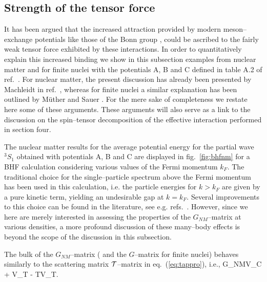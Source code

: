 \subsection{Strength of the tensor force}
It has been argued that the increased attraction provided
by modern meson--exchange potentials like those of the Bonn group
\cite{mac89,mhe87}, could be ascribed to the fairly weak tensor force
exhibited by these interactions. In order to quantitatively
explain this increased binding we show in this subsection examples
from nuclear matter and for finite nuclei with the potentials A, B and C defined
in table A.2 of ref.\ \cite{mac89}. For nuclear matter, the present
discussion has already been presented by Machleidt in ref.\  \cite{mac89},
whereas for finite nuclei a similar explanation has been
outlined by M\"{u}ther and Sauer \cite{ms92}. For the mere sake of
completeness we restate here some of these arguments. These arguments
will also serve as a link to the discussion on
the spin--tensor decomposition of
the effective interaction performed in section four.


The nuclear matter results for the average potential energy for the partial wave $^{3}S_1$
obtained with potentials A, B and C are displayed
in fig.\ \ref{fig:bhfnm} for a BHF calculation considering various values of
the Fermi
momentum $k_F$. The traditional choice for the single--particle
spectrum above the Fermi momentum has been used in this calculation,
i.e. the particle energies for $k > k_F$ are given by a pure kinetic
term,
yielding an undesirable gap at $k=k_F$. Several improvements to this choice
can be found in the literature,
see e.g. refs.\ \cite{mb90,ms89,km83}. However, since we here are
merely interested in assessing  the properties of the $G_{NM}$--matrix
at various densities, a more
profound discussion of these many--body effects is beyond the scope
of the discussion in this subsection.

The bulk of the $G_{NM}$--matrix ( and the $G$--matrix for
finite nuclei) behaves similarly to the scattering matrix ${\cal T}$--matrix
in eq.\ (\ref{eq:tappro}), i.e.,
\be
G_{NM}\approx V_C + V_T 
{\omega - T}V_T.\label{eq:gappro}
\ee

